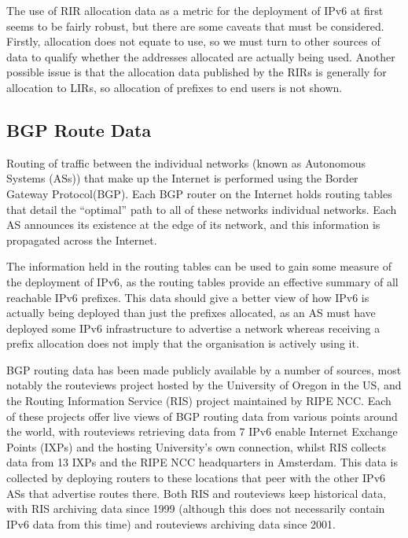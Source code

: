 The use of RIR allocation data as a metric for the deployment of IPv6 at first
seems to be fairly robust, but there are some caveats that must be considered.
Firstly, allocation does not equate to use, so we must turn to other sources of
data to qualify whether the addresses allocated are actually being used. Another
possible issue is that the allocation data published by the RIRs is generally
for allocation to LIRs, so allocation of prefixes to end users is not shown.


\subsection{BGP Route Data}

Routing of traffic between the individual networks (known as Autonomous
Systems (ASs)) that make up the Internet is performed using the Border Gateway
Protocol(BGP). Each BGP router on the Internet holds routing tables that
detail the ``optimal'' path to all of these networks individual networks.
Each AS announces its existence at the edge of its network, and this
information is propagated across the Internet.

The information held in the routing tables can be used to gain some measure of
the deployment of IPv6, as the routing tables provide an effective summary of
all reachable IPv6 prefixes. This data should give a better view of how IPv6 is
actually being deployed than just the prefixes allocated\cite{karpilovsky_quantifying_2009}, as an AS must
have deployed some IPv6 infrastructure to advertise a network whereas receiving
a prefix allocation does not imply that the organisation is actively using it.

BGP routing data has been made publicly available by a number of sources, most
notably the routeviews\cite{meyer_route_2005} project hosted by the University of Oregon in the
US, and the Routing Information Service (RIS) project maintained by RIPE
NCC\cite{ripe_ncc_routing_????}.
Each of these projects offer live views of BGP routing data from various points
around the world, with routeviews retrieving data from 7 IPv6 enable Internet
Exchange Points (IXPs) and the hosting University's own connection, whilst RIS
collects data from 13 IXPs and the RIPE NCC headquarters in Amsterdam. This data
is collected by deploying routers to these locations that peer with the other
IPv6 ASs that advertise routes there. Both RIS and routeviews keep historical data, with RIS
archiving data since 1999 (although this does not necessarily contain IPv6 data
from this time) and routeviews archiving data since 2001. 


